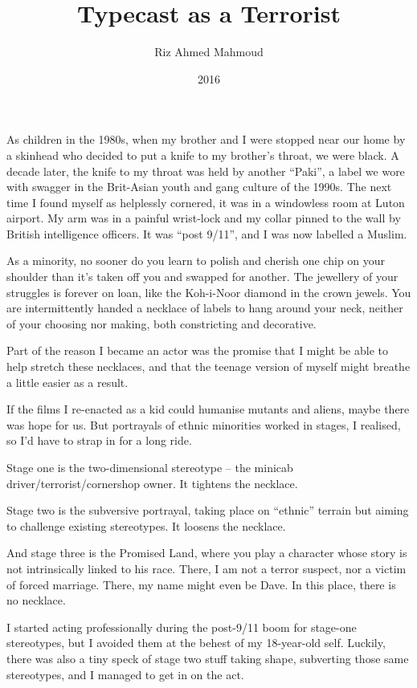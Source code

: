 \documentclass[10pt,a4paper]{article}
\begin{document}
\title{Typecast as a Terrorist}
\date{2016}
\author{Riz Ahmed Mahmoud}
\maketitle

\setcounter{page}{1}
\linenumbers As children in the 1980s, when my brother and I were stopped near our home by a skinhead who decided to put a knife to my brother’s throat, we were black. A decade later, the knife to my throat was held by another “Paki”, a label we wore with swagger in the Brit-Asian youth and gang culture of the 1990s. The next time I found myself as helplessly cornered, it was in a windowless room at Luton airport. My arm was in a painful wrist-lock and my collar pinned to the wall by British intelligence officers. It was “post 9/11”, and I was now labelled a Muslim.

As a minority, no sooner do you learn to polish and cherish one chip on your shoulder than it’s taken off you and swapped for another. The jewellery of your struggles is forever on loan, like the Koh-i-Noor diamond in the crown jewels. You are intermittently handed a necklace of labels to hang around your neck, neither of your choosing nor making, both constricting and decorative.

Part of the reason I became an actor was the promise that I might be able to help stretch these necklaces, and that the teenage version of myself might breathe a little easier as a result.

If the films I re-enacted as a kid could humanise mutants and aliens, maybe there was hope for us. But portrayals of ethnic minorities worked in stages, I realised, so I’d have to strap in for a long ride.

Stage one is the two-dimensional stereotype – the minicab driver/terrorist/cornershop owner. It tightens the necklace.

Stage two is the subversive portrayal, taking place on “ethnic” terrain but aiming to challenge existing stereotypes. It loosens the necklace.

And stage three is the Promised Land, where you play a character whose story is not intrinsically linked to his race. There, I am not a terror suspect, nor a victim of forced marriage. There, my name might even be Dave. In this place, there is no necklace.

I started acting professionally during the post-9/11 boom for stage-one stereotypes, but I avoided them at the behest of my 18-year-old self. Luckily, there was also a tiny speck of stage two stuff taking shape, subverting those same stereotypes, and I managed to get in on the act.
\end{document}
